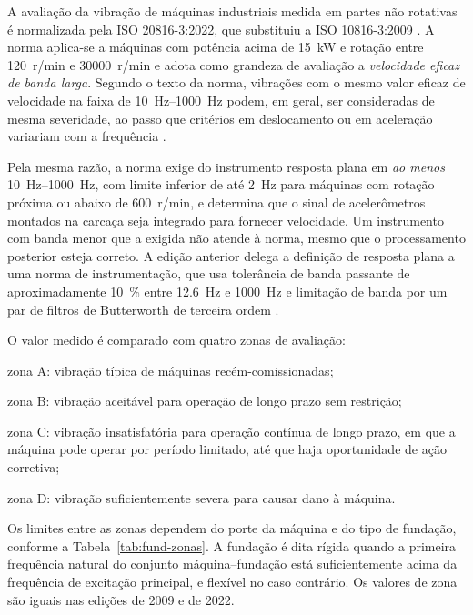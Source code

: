 A avaliação da vibração de máquinas industriais medida em partes não rotativas é normalizada pela ISO 20816-3:2022, que substituiu a
ISO 10816-3:2009 . A norma aplica-se a
máquinas com potência acima de \SI{15}{\kilo\watt} e rotação entre \SI{120}{r/min} e \SI{30000}{r/min} e adota como grandeza de avaliação
a \emph{velocidade eficaz de banda larga}. Segundo o texto da norma, vibrações com o mesmo valor eficaz de velocidade na faixa de
\SIrange{10}{1000}{\hertz} podem, em geral, ser consideradas de mesma severidade, ao passo que critérios em deslocamento ou em aceleração
variariam com a frequência \cite{iso208163_2022}.

Pela mesma razão, a norma exige do instrumento resposta plana em \emph{ao menos} \SIrange{10}{1000}{\hertz}, com limite inferior de até
\SI{2}{\hertz} para máquinas com rotação próxima ou abaixo de \SI{600}{r/min}, e determina que o sinal de acelerômetros montados na carcaça
seja integrado para fornecer velocidade. Um instrumento com banda menor que a exigida não atende à norma, mesmo que o processamento posterior
esteja correto. A edição anterior delega a definição de resposta plana a uma norma de instrumentação, que usa tolerância de banda passante de
aproximadamente \SI{10}{\percent} entre \SI{12,6}{\hertz} e \SI{1000}{\hertz} e limitação de banda por um par de filtros de Butterworth de
terceira ordem \cite{iso2954_2012}.

O valor medido é comparado com quatro zonas de avaliação:

\begin{alineas}
  \item zona A: vibração típica de máquinas recém-comissionadas;
  \item zona B: vibração aceitável para operação de longo prazo sem restrição;
  \item zona C: vibração insatisfatória para operação contínua de longo prazo, em que a máquina pode operar por período limitado, até que haja
        oportunidade de ação corretiva;
  \item zona D: vibração suficientemente severa para causar dano à máquina.
\end{alineas}

Os limites entre as zonas dependem do porte da máquina e do tipo de fundação, conforme a Tabela~\ref{tab:fund-zonas}. A fundação é dita rígida
quando a primeira frequência natural do conjunto máquina--fundação está suficientemente acima da frequência de excitação principal, e flexível
no caso contrário. Os valores de zona são iguais nas edições de 2009 e de 2022.


